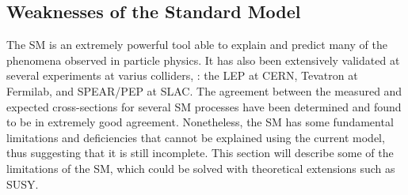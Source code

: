 	\subsection{Weaknesses of the Standard Model}
	\label{subsec:SMweaknesses}
	The \ac{SM} is an extremely powerful tool able to explain and predict many of the phenomena observed in particle physics. It has also been extensively validated at several experiments at varius colliders, \eg : the \ac{LEP} at \ac{CERN}, Tevatron at Fermilab, and SPEAR/PEP at SLAC. The agreement between the measured and expected cross-sections for several \ac{SM} processes have been determined and found to be in extremely good agreement. Nonetheless, the \ac{SM} has some fundamental limitations and deficiencies that cannot be explained using the current model, thus suggesting that it is still incomplete. 
	This section will describe some of the limitations of the \ac{SM}, which could be solved with theoretical 	extensions such as \ac{SUSY}.
